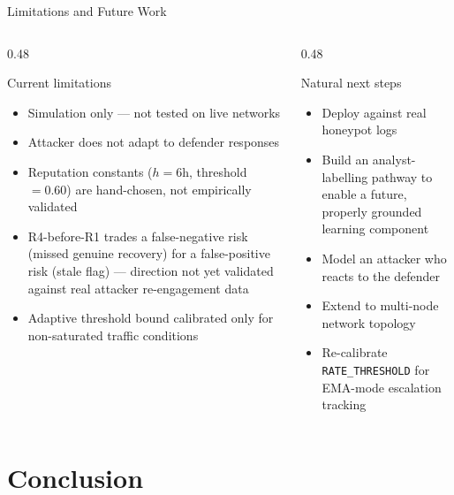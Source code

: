 \documentclass[aspectratio=169, 12pt]{beamer}
\begin{document}
\begin{frame}{Limitations and Future Work}
  \begin{columns}[T]
    \begin{column}{0.48\textwidth}
      \begin{alertblock}{Current limitations}
        \begin{itemize}
          \item Simulation only --- not tested on live networks
          \item Attacker does not adapt to defender responses
          \item Reputation constants ($h=6$h, threshold $=0.60$) are
                hand-chosen, not empirically validated
          \item R4-before-R1 trades a false-negative risk (missed
                genuine recovery) for a false-positive risk (stale
                flag) --- direction not yet validated against real
                attacker re-engagement data
          \item Adaptive threshold bound calibrated only for
                non-saturated traffic conditions
        \end{itemize}
      \end{alertblock}
    \end{column}
    \begin{column}{0.48\textwidth}
      \begin{exampleblock}{Natural next steps}
        \begin{itemize}
          \item Deploy against real honeypot logs
          \item Build an analyst-labelling pathway to enable a future,
                properly grounded learning component
          \item Model an attacker who reacts to the defender
          \item Extend to multi-node network topology
          \item Re-calibrate \texttt{RATE\_THRESHOLD} for EMA-mode
                escalation tracking
        \end{itemize}
      \end{exampleblock}
    \end{column}
  \end{columns}
\end{frame}

\section{Conclusion}
\end{document}
